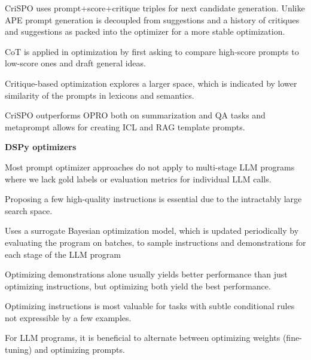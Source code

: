 CriSPO uses prompt+score+critique triples for next candidate generation. \cite{he2024crispomultiaspectcritiquesuggestionguidedautomatic}
Unlike APE \cite{pryzant2023automaticpromptoptimizationgradient} prompt generation is decoupled from suggestions and a history of critiques and suggestions as packed into the optimizer for a more stable optimization. \cite{he2024crispomultiaspectcritiquesuggestionguidedautomatic}

CoT is applied in optimization by first asking to compare high-score prompts to low-score ones and draft general ideas. \cite{he2024crispomultiaspectcritiquesuggestionguidedautomatic}

Critique-based optimization explores a larger space, which is indicated by lower similarity of the prompts in lexicons and semantics.\cite{he2024crispomultiaspectcritiquesuggestionguidedautomatic}

CriSPO outperforms OPRO \cite{yang2024largelanguagemodelsoptimizers} both on summarization and QA tasks and metaprompt allows for creating ICL and RAG template prompts. \cite{he2024crispomultiaspectcritiquesuggestionguidedautomatic}

\textbf{DSPy optimizers}

Most prompt optimizer approaches do not apply to multi-stage LLM programs where we lack gold labels or evaluation metrics for individual LLM calls. \cite{opsahlong2024optimizinginstructionsdemonstrationsmultistage}

Proposing a few high-quality instructions is essential due to the intractably large search space. \cite{opsahlong2024optimizinginstructionsdemonstrationsmultistage}

Uses a surrogate Bayesian optimization model, which is updated periodically by evaluating the program on batches, to sample instructions and demonstrations for each stage of the LLM program \cite{opsahlong2024optimizinginstructionsdemonstrationsmultistage}

Optimizing demonstrations alone usually yields better performance than just optimizing instructions, but optimizing both yield the best performance. \cite{opsahlong2024optimizinginstructionsdemonstrationsmultistage}

Optimizing instructions is most valuable for tasks with subtle conditional rules not expressible by a few examples.  \cite{opsahlong2024optimizinginstructionsdemonstrationsmultistage}

For LLM programs, it is beneficial to alternate between optimizing weights (fine-tuning) and optimizing prompts. \cite{soylu2024finetuningpromptoptimizationgreat}

